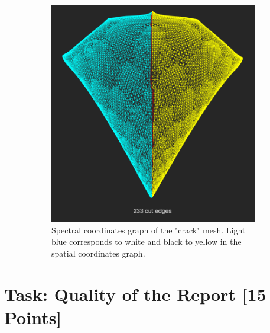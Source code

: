 \documentclass[unicode,11pt,a4paper,oneside,numbers=endperiod,openany]{scrartcl}
\begin{document}
\begin{figure}[H]
\begin{subfigure}[b]{0.475\textwidth}
            \includegraphics[width=\textwidth]{15.png}
            {{\small Spectral coordinates graph of the "crack" mesh.  Light blue corresponds to white and black to yellow in the spatial coordinates graph.}}    
        \end{subfigure}
\label{figure:ex63meshes}
    \end{figure}

\section{Task: Quality of the Report [15 Points] }
\end{document}
